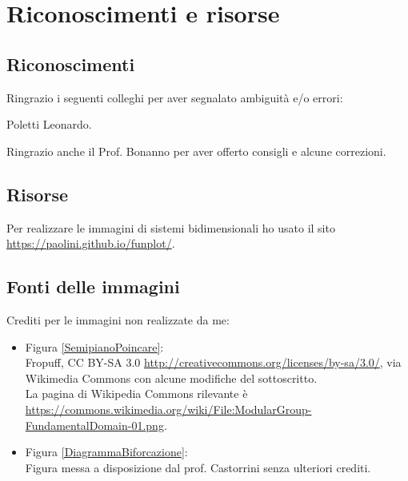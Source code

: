\chapter{Riconoscimenti e risorse}
\section*{Riconoscimenti}
Ringrazio i seguenti colleghi per aver segnalato ambiguit\`a e/o errori:
\begin{center}
Poletti Leonardo.
\end{center}
Ringrazio anche il Prof. Bonanno per aver offerto consigli e alcune correzioni.
\section*{Risorse}
Per realizzare le immagini di sistemi bidimensionali ho usato il sito \url{https://paolini.github.io/funplot/}.
\section*{Fonti delle immagini}
Crediti per le immagini non realizzate da me:
\begin{itemize}
\item Figura \ref{SemipianoPoincare}:\\
Fropuff, CC BY-SA 3.0 \url{http://creativecommons.org/licenses/by-sa/3.0/}, via Wikimedia Commons con alcune modifiche del sottoscritto.\\
La pagina di Wikipedia Commons rilevante \`e \url{https://commons.wikimedia.org/wiki/File:ModularGroup-FundamentalDomain-01.png}.
\item Figura \ref{DiagrammaBiforcazione}:\\
Figura messa a disposizione dal prof. Castorrini senza ulteriori crediti.
\end{itemize}
